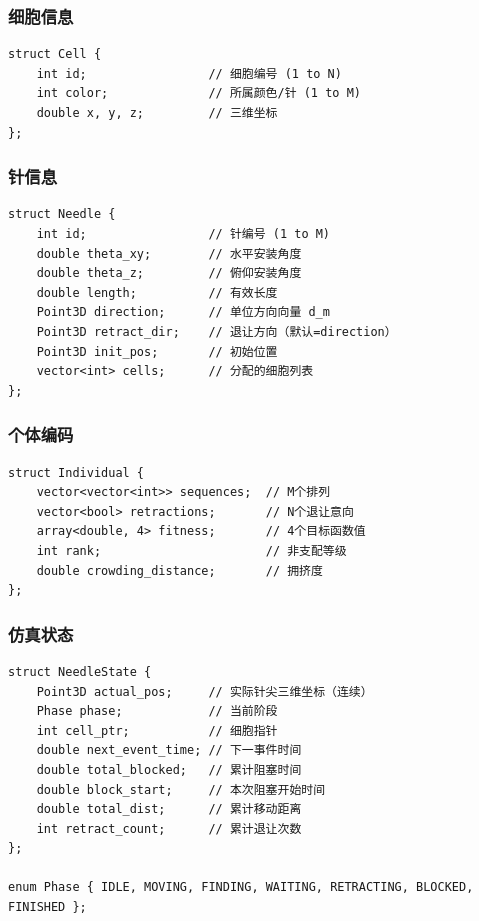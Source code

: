 \documentclass[11pt,a4paper]{article}
\begin{document}
\subsubsection{细胞信息}
\begin{verbatim}
struct Cell {
    int id;                 // 细胞编号 (1 to N)
    int color;              // 所属颜色/针 (1 to M)
    double x, y, z;         // 三维坐标
};
\end{verbatim}

\subsubsection{针信息}
\begin{verbatim}
struct Needle {
    int id;                 // 针编号 (1 to M)
    double theta_xy;        // 水平安装角度
    double theta_z;         // 俯仰安装角度
    double length;          // 有效长度
    Point3D direction;      // 单位方向向量 d_m
    Point3D retract_dir;    // 退让方向（默认=direction）
    Point3D init_pos;       // 初始位置
    vector<int> cells;      // 分配的细胞列表
};
\end{verbatim}

\subsubsection{个体编码}
\begin{verbatim}
struct Individual {
    vector<vector<int>> sequences;  // M个排列
    vector<bool> retractions;       // N个退让意向
    array<double, 4> fitness;       // 4个目标函数值
    int rank;                       // 非支配等级
    double crowding_distance;       // 拥挤度
};
\end{verbatim}

\subsubsection{仿真状态}
\begin{verbatim}
struct NeedleState {
    Point3D actual_pos;     // 实际针尖三维坐标（连续）
    Phase phase;            // 当前阶段
    int cell_ptr;           // 细胞指针
    double next_event_time; // 下一事件时间
    double total_blocked;   // 累计阻塞时间
    double block_start;     // 本次阻塞开始时间
    double total_dist;      // 累计移动距离
    int retract_count;      // 累计退让次数
};

enum Phase { IDLE, MOVING, FINDING, WAITING, RETRACTING, BLOCKED, FINISHED };
\end{verbatim}
\end{document}
